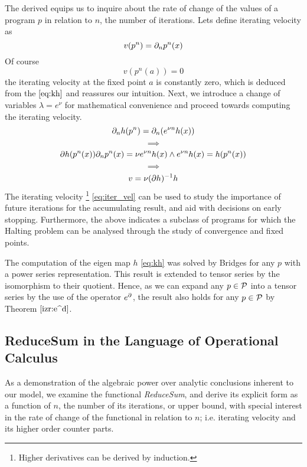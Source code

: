 The derived equips us to inquire about the rate of change of the values of a program $p$ in relation to $n$, the number of iterations. Lets define iterating velocity as
  \begin{equation}
  v(p^n)=\partial_np^n(x)
  \end{equation}
Of course
  \begin{equation}
  v(p^n(a))=0
  \end{equation}
the iterating velocity at the fixed point $a$ is constantly zero, which is deduced from the $\eqref{eq:kh}$ and reassures our intuition. Next, we introduce a change of variables $\lambda= e^\nu$ for mathematical convenience and proceed towards computing the iterating velocity.
  $$\partial_nh(p^n)=\partial_n(e^{\nu n}h(x))$$
  $$\implies$$
  $$\partial h(p^n(x))\partial_np^n(x)=\nu e^{\nu n}h(x) \land e^{\nu n}h(x)=h(p^n(x))$$
  $$\implies$$
  \begin{equation}\label{eq:iter_vel}
  v=\nu(\partial h)^{-1}h
  \end{equation}
The iterating velocity
\footnote{Higher derivatives can be derived by induction.}
\eqref{eq:iter_vel} can be used to study the importance of future iterations for the accumulating result, and aid with decisions on early stopping. Furthermore, the above indicates a subclass of programs for which the Halting problem can be analysed through the study of convergence and fixed points.

The computation of the eigen map $h$ \eqref{eq:kh} was solved by Bridges \cite{bridges2016solution} for any $p$ with a power series representation. This result is extended to tensor series by the isomorphism to their quotient. Hence, as we can expand any $p\in\mathcal{P}$ into a tensor series by the use of the operator $e^\partial$, the result also holds for any $p\in\mathcal{P}$ by Theorem $\ref{izr:e^d}$. 


\subsection{ReduceSum in the Language of Operational Calculus}

As a demonstration of the algebraic power over analytic conclusions inherent to our model, we examine the functional \emph{ReduceSum}, and derive its explicit form as a function of $n$, the number of its iterations, or upper bound, with special interest in the rate of change of the functional in relation to $n$; i.e. iterating velocity and its higher order counter parts. 

